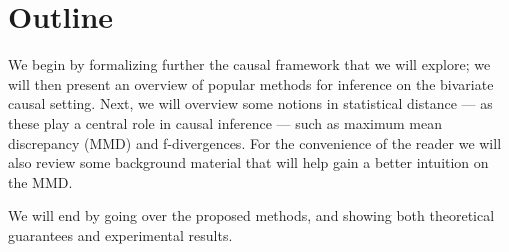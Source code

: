\section{Outline}

We begin by formalizing further the causal framework that we will explore; we will then present an overview of 
popular methods for inference on the bivariate causal setting. Next, we will overview some notions in statistical distance 
--- as these play a central role in causal inference --- such as maximum mean discrepancy (MMD) and f-divergences. 
For the convenience of the reader we will also review some background material that will help gain a better 
intuition on the MMD. 

We will end by going over the proposed methods, and showing both theoretical guarantees and experimental results. 




